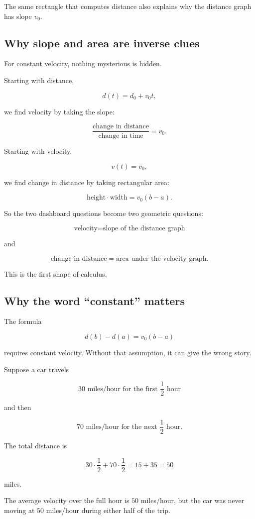 The same rectangle that computes distance also explains why the distance graph has slope \(v_0\).

\subsection{Why slope and area are inverse clues}

For constant velocity, nothing mysterious is hidden.

Starting with distance,

\[
d(t)=d_0+v_0t,
\]

we find velocity by taking the slope:

\[
\frac{\text{change in distance}}{\text{change in time}}=v_0.
\]

Starting with velocity,

\[
v(t)=v_0,
\]

we find change in distance by taking rectangular area:

\[
\text{height}\cdot \text{width}=v_0(b-a).
\]

So the two dashboard questions become two geometric questions:

\[
\boxed{\text{velocity}=\text{slope of the distance graph}}
\]

and

\[
\boxed{\text{change in distance}=\text{area under the velocity graph}.}
\]

This is the first shape of calculus.

\subsection{Why the word ``constant'' matters}

The formula

\[
d(b)-d(a)=v_0(b-a)
\]

requires constant velocity. Without that assumption, it can give the wrong story.

Suppose a car travels

\[
30\text{ miles/hour for the first } \frac12\text{ hour}
\]

and then

\[
70\text{ miles/hour for the next } \frac12\text{ hour}.
\]

The total distance is

\[
30\cdot \frac12 +70\cdot \frac12
=
15+35
=
50
\]

miles.

The average velocity over the full hour is \(50\) miles/hour, but the car was never moving at \(50\) miles/hour during either half of the trip.


